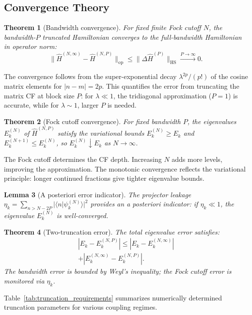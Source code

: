 \documentclass[reprint, floatfix, superscriptaddress, amsmath, amssymb, longbibliography]{revtex4-2}
\newtheorem{theorem}{Theorem}[section]
\newtheorem{lemma}[theorem]{Lemma}
\begin{document}
\subsection{Convergence Theory}
\label{sec:convergence}

\begin{theorem}[Bandwidth convergence]
\label{thm:bandwidth_convergence}
For fixed finite Fock cutoff $N$, the bandwidth-$P$ truncated Hamiltonian converges to the full-bandwidth Hamiltonian in operator norm:
\begin{equation}
\|\hat{H}^{(N,\infty)} - \hat{H}^{(N,P)}\|_{\mathrm{op}} \le \|\Delta\hat{H}^{(P)}\|_{\mathrm{HS}} \xrightarrow{P \to \infty} 0.
\end{equation}
\end{theorem}

The convergence follows from the super-exponential decay $\lambda^{2p}/(p!)$ of the cosine matrix elements for $|n-m| = 2p$. This quantifies the error from truncating the matrix CF at block size $P$: for $\lambda \ll 1$, the tridiagonal approximation ($P=1$) is accurate, while for $\lambda \sim 1$, larger $P$ is needed.

\begin{theorem}[Fock cutoff convergence]
\label{thm:fock_convergence}
For fixed bandwidth $P$, the eigenvalues $E_k^{(N)}$ of $\hat{H}^{(N,P)}$ satisfy the variational bounds $E_k^{(N)} \ge E_k$ and $E_k^{(N+1)} \le E_k^{(N)}$, so $E_k^{(N)} \downarrow E_k$ as $N \to \infty$.
\end{theorem}

The Fock cutoff determines the CF depth. Increasing $N$ adds more levels, improving the approximation. The monotonic convergence reflects the variational principle: longer continued fractions give tighter eigenvalue bounds.

\begin{lemma}[A posteriori error indicator]
\label{lem:leakage}
The projector leakage $\eta_k = \sum_{n > N - 2P} |\langle n | \psi_k^{(N)} \rangle|^2$ provides an a posteriori indicator: if $\eta_k \ll 1$, the eigenvalue $E_k^{(N)}$ is well-converged.
\end{lemma}

\begin{theorem}[Two-truncation error]
\label{thm:two_truncation}
The total eigenvalue error satisfies:
\begin{multline}
|E_k - E_k^{(N,P)}| \le |E_k - E_k^{(N,\infty)}| \\
+ |E_k^{(N,\infty)} - E_k^{(N,P)}|.
\label{eq:two_truncation_error}
\end{multline}
The bandwidth error is bounded by Weyl's inequality; the Fock cutoff error is monitored via $\eta_k$.
\end{theorem}
Table~\ref{tab:truncation_requirements} summarizes numerically determined truncation parameters for various coupling regimes.
\end{document}
